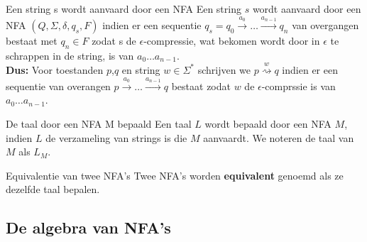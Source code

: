 \newpage

\begin{theo}{Een string s wordt aanvaard door een NFA}
    Een string $s$ wordt aanvaard door een NFA $(Q,\Sigma, \delta, q_s, F)$ indien
    er een sequentie $q_s = q_0 \overset{a_0}{\to} \ldots \overset{a_{n-1}}{\to} q_n$
    van overgangen bestaat met $q_n \in F$ zodat s de $\epsilon$-compressie, wat bekomen wordt door
    in $\epsilon$ te schrappen in de string, is van $a_0 \ldots a_{n-1}$. \\
    
    \noindent \textbf{Dus:} Voor toestanden $p$,$q$ en string $w \in \Sigma^*$ schrijven we $p \overset{w}{\rightsquigarrow} q$
    indien er een sequentie van overangen $ p \overset{a_0}{\to} \ldots \overset{a_{n-1}}{\to} q$ bestaat zodat $w$
    de $\epsilon$-comprssie is van $a_0 \ldots a_{n-1}$.
\end{theo}

\begin{theo}{De taal door een NFA M bepaald}
    Een taal $L$ wordt bepaald door een NFA $M$, indien $L$ de verzameling van strings is die $M$ aanvaardt.
    We noteren de taal van $M$ als $L_M$.
\end{theo}

\begin{theo}{Equivalentie van twee NFA's}
    Twee NFA's worden \textbf{equivalent} genoemd als ze dezelfde taal bepalen.
\end{theo}

\subsection{De algebra van NFA's}

\vspace{0.5cm}

